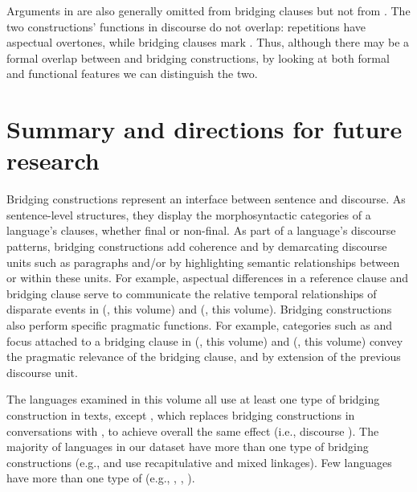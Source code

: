 \documentclass[output=paper]{LSP/langsci}
\begin{document}
Arguments in  are also generally omitted from bridging clauses but not from . The two constructions’ functions in discourse do not overlap: repetitions have aspectual overtones, while bridging clauses mark  \citep[][513--522]{kasia17}. Thus, although there may be a formal overlap between  and bridging constructions, by looking at both formal and functional features we can distinguish the two.

\section{Summary and directions for future research}
\label{GuAi6summary}
Bridging constructions represent an interface between sentence and discourse. As sentence-level structures, they display the morphosyntactic categories of a language's clauses, whether final or non-final. As part of a language’s discourse patterns, bridging constructions add coherence and  by demarcating discourse units such as paragraphs and/or by highlighting semantic relationships between or within these units. For example, aspectual differences in a reference clause and bridging clause serve to communicate the relative temporal relationships of disparate events in  (\citeauthor{aiton18}, this volume) and  (\citeauthor{jarkey18}, this volume). Bridging constructions also perform specific pragmatic functions. For example, categories such as  and focus attached to a bridging clause in  (\citeauthor{aiton18}, this volume) and  (\citeauthor{devries18}, this volume) convey the pragmatic relevance of the bridging clause, and by extension of the previous discourse unit. 

The languages examined in this volume all use at least one type of bridging construction in texts, except , which replaces bridging constructions in conversations with , to achieve overall the same effect (i.e., discourse ). The majority of languages in our dataset have more than one type of bridging constructions (e.g.,  and  use recapitulative and mixed linkages). Few languages have more than one type of  (e.g., , , ).
\end{document}

